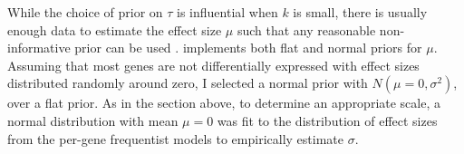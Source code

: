 While the choice of prior on $\tau$ is influential when $k$ is small, there is usually enough data to estimate the effect size $\mu$ such that any reasonable non-informative prior can be used \autocite{gelman2006PriorDistributionsVariance,friede2017MetaanalysisFewSmall}.
 implements both flat and normal priors for $\mu$.
%
Assuming that most genes are not differentially expressed with effect sizes distributed randomly around zero, I selected a normal prior with $N(\mu=0, \sigma^2)$, over a flat prior. As in the section above, to determine an appropriate scale, a normal distribution with mean $\mu = 0$ was fit to the distribution of effect sizes from the per-gene frequentist models to empirically estimate $\sigma$.


